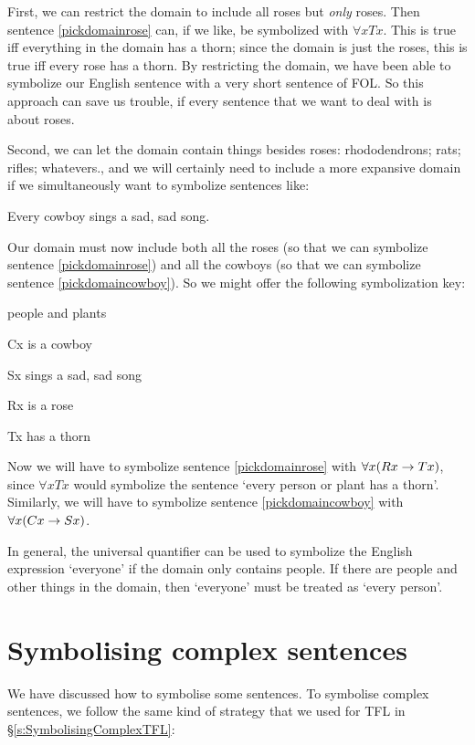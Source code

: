 First, we can restrict the domain to include all roses but \emph{only} roses. Then sentence \ref{pickdomainrose} can, if we like, be symbolized with $\forall x Tx$. This is true iff everything in the domain has a thorn; since the domain is just the roses, this is true iff every rose has a thorn. By restricting the domain, we have been able to symbolize our English sentence with a very short sentence of FOL. So this approach can save us trouble, if every sentence that we want to deal with is about roses.

Second, we can let the domain contain things besides roses: rhododendrons; rats; rifles; whatevers., and we will certainly need to include a more expansive domain if we simultaneously want to symbolize sentences like:
	\begin{earg}
		\item[\ex{pickdomaincowboy}] Every cowboy sings a sad, sad song.
	\end{earg}
Our domain must now include both all the roses (so that we can symbolize sentence \ref{pickdomainrose}) and all the cowboys (so that we can symbolize sentence \ref{pickdomaincowboy}). So we might offer the following symbolization key:
	\begin{ekey}
		\item[\text{domain}] people and plants
		\item[Cx]  is a cowboy
		\item[Sx]  sings a sad, sad song
		\item[Rx]  is a rose
		\item[Tx]  has a thorn
	\end{ekey}
Now we will have to symbolize sentence \ref{pickdomainrose} with $\forall x (Rx \rightarrow Tx)$, since $\forall x Tx$ would symbolize the sentence `every person or plant has a thorn'. Similarly, we will have to symbolize sentence \ref{pickdomaincowboy} with $\forall x (Cx \rightarrow Sx)$.

In general, the universal quantifier can be used to symbolize the English expression `everyone' if the domain only contains people. If there are people and other things in the domain, then `everyone' must be treated as `every person'.

\chapter{Symbolising complex sentences}
\label{s:SymbolisingComplexFOL}
We have discussed how to symbolise some sentences. To symbolise complex sentences, we follow the same kind of strategy that we used for TFL in \S\ref{s:SymbolisingComplexTFL}:

